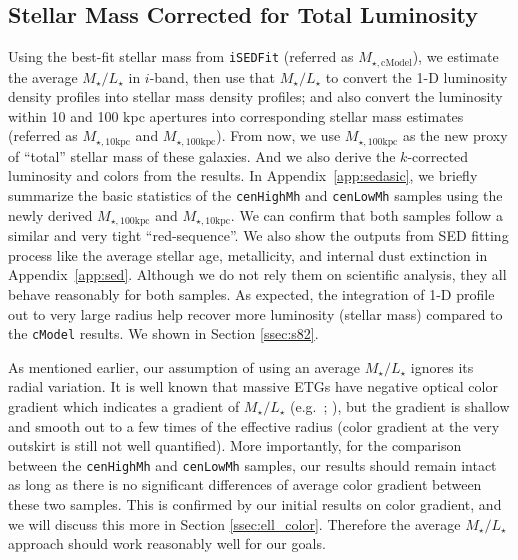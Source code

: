 \documentclass[a4paper,fleqn,usenatbib]{mnras}
\def\cmodel{\texttt{cModel}}
\def\rbcg{\texttt{cenHighMh}}
\def\nbcg{\texttt{cenLowMh}}
\def\minn{{$M_{\star,10\mathrm{kpc}}$}}
\def\mtot{{$M_{\star,100\mathrm{kpc}}$}}
\def\mcmodel{{$M_{\star,\mathrm{cModel}}$}}
\def\m2l{{$M_{\star}/L_{\star}$}}
\begin{document}
\subsection{Stellar Mass Corrected for Total Luminosity}
    \label{ssec:mtotal}
    
    Using the best-fit stellar mass from \texttt{iSEDFit} (referred as \mcmodel{}), 
    we estimate the average \m2l{} in $i$-band, then use that \m2l{} to convert the 
    1-D luminosity density profiles into stellar mass density profiles; and 
    also convert the luminosity within 10 and 100 kpc apertures into 
    corresponding stellar mass estimates (referred as \minn{} and \mtot{}). 
    From now, we use \mtot{} as the new proxy of ``total'' stellar mass of these 
    galaxies.  
    And we also derive the $k$-corrected luminosity and colors from the results.
    In Appendix~\ref{app:sedasic}, we briefly summarize the basic statistics of 
    the \rbcg{} and \nbcg{} samples using the newly derived \mtot{} and \minn{}.
    We can confirm that both samples follow a similar and very tight ``red-sequence''.
    We also show the outputs from SED fitting process like the average stellar age, 
    metallicity, and internal dust extinction in Appendix~\ref{app:sed}.
    Although we do not rely them on scientific analysis, they all behave reasonably for 
    both samples. 
    As expected, the integration of 1-D profile out to very large radius help 
    recover more luminosity (stellar mass) compared to the \cmodel{} results. 
    We shown in Section \ref{ssec:s82}.
    
    As mentioned earlier, our assumption of using an average \m2l{} ignores its
    radial variation.   
    It is well known that massive ETGs have negative optical color gradient which 
    indicates a gradient of \m2l{} (e.g.\ \citealt{LaBarbera2012}; 
    \citealt{DSouza2015}), but the gradient is shallow and smooth out to a few 
    times of the effective radius (color gradient at the very outskirt is still 
    not well quantified). 
    More importantly, for the comparison between the \rbcg{} and \nbcg{} samples, 
    our results should remain intact as long as there is no significant
    differences of average color gradient between these two samples.
    This is confirmed by our initial results on color gradient, and we will 
    discuss this more in Section \ref{ssec:ell_color}.
    Therefore the average \m2l{} approach should work reasonably well for our goals.
    
\end{document}
